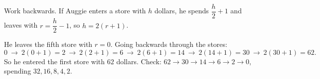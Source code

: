 Work backwards. If Auggie enters a store with $h$ dollars, he spends $\dfrac{h}{2}+1$ and leaves with $r=\dfrac{h}{2}-1$, so $h=2(r+1)$.

He leaves the fifth store with $r=0$. Going backwards through the stores:
\[
0\ \to\ 2(0+1)=2\ \to\ 2(2+1)=6\ \to\ 2(6+1)=14\ \to\ 2(14+1)=30\ \to\ 2(30+1)=62 .
\]
So he entered the first store with $\boxed{62}$ dollars. Check: $62\to30\to14\to6\to2\to0$, spending $32,16,8,4,2$.
